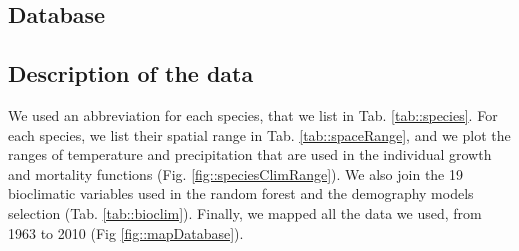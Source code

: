 \documentclass[letterpaper, 12pt]{article}
\theoremstyle{theo}
\begin{document}
\tableofcontents
\listoftables
\listoffigures

\begin{refsection}
\begin{onehalfspace}

\section{Database} \label{app::database}
\subsection{Description of the data}
We used an abbreviation for each species, that we list in Tab. \ref{tab::species}. For each species, we list their spatial range in Tab. \ref{tab::spaceRange}, and we plot the ranges of temperature and precipitation that are used in the individual growth and mortality functions (Fig. \ref{fig::speciesClimRange}).  We also join the 19 bioclimatic variables used in the random forest and the demography models selection (Tab. \ref{tab::bioclim}). Finally, we mapped all the data we used, from 1963 to 2010 (Fig \ref{fig::mapDatabase}).


\end{onehalfspace}
\end{refsection}
\end{document}
